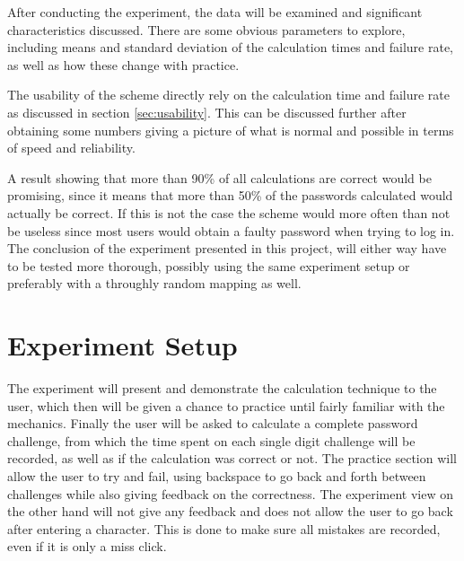 \par After conducting the experiment, the data will be examined and significant characteristics discussed. There are some obvious parameters to explore, including means and standard deviation of the calculation times and failure rate, as well as how these change with practice. 

\par The usability of the scheme directly rely on the calculation time and failure rate as discussed in section \ref{sec:usability}. This can be discussed further after obtaining some numbers giving a picture of what is normal and possible in terms of speed and reliability.
\par A result showing that more than 90\% of all calculations are correct would be promising, since it means that more than 50\% of the passwords calculated would actually be correct. If this is not the case the scheme would more often than not be useless since most users would obtain a faulty password when trying to log in. The conclusion of the experiment presented in this project, will either way have to be tested more thorough, possibly using the same experiment setup or preferably with a throughly random mapping as well. 



\section{Experiment Setup}
The experiment will present and demonstrate the calculation technique to the user, which then will be given a chance to practice until fairly familiar with the mechanics. Finally the user will be asked to calculate a complete password challenge, from which the time spent on each single digit challenge will be recorded, as well as if the calculation was correct or not. The practice section will allow the user to try and fail, using backspace to go back and forth between challenges while also giving feedback on the correctness. The experiment view on the other hand will not give any feedback and does not allow the user to go back after entering a character. This is done to make sure all mistakes are recorded, even if it is only a miss click. 
